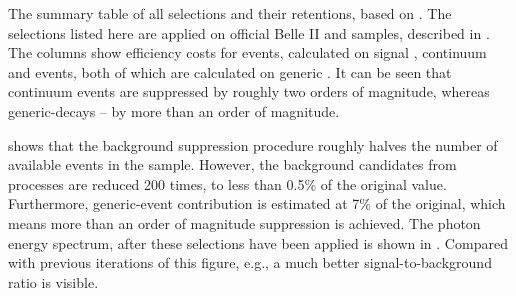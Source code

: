 \begin{table}[htbp!]
    \centering
    \caption{\label{tab:cutflow} The summary table of all selections and their retentions, based on .
    The selections listed here are applied on official Belle II \feiBp and \feiBz samples, described in .
    The columns show efficiency costs for \BtoXsgamma events, calculated on signal \MC, continuum and \BB events, both of which are calculated on generic \MC.
    It can be seen that continuum events are suppressed by roughly two orders of magnitude, whereas generic-\BB decays -- by more than an order of magnitude.
    }
    
\end{table}

 shows that the background suppression procedure roughly halves the number of available \BtoXsgamma events in the sample.
However, the background candidates from \epem\ra\qqbar processes are reduced 200 times, to less than 0.5\% of the original value.
Furthermore, generic-\BB event contribution is estimated at 7\% of the original, which means more than an order of magnitude suppression is achieved.
The photon energy spectrum, after these selections have been applied is shown in .
Compared with previous iterations of this figure, e.g., a much better signal-to-background ratio is visible.

